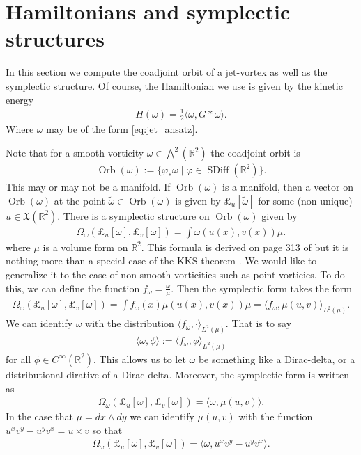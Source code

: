 \documentclass[12pt]{amsart}
\newcommand{\R}{\ensuremath{\mathbb{R}}}
\DeclareMathOperator{\SDiff}{SDiff}
\DeclareMathOperator{\Orb}{Orb}
\begin{document}
\section{Hamiltonians and symplectic structures}
\label{sec:symplectic}
In this section we compute the coadjoint orbit of a jet-vortex
as well as the symplectic structure.
Of course, the Hamiltonian we use is given by
the kinetic energy
\begin{align*}
  H(\omega) = \frac{1}{2} \langle \omega , G* \omega \rangle.
\end{align*}
Where $\omega$ may be of the form \eqref{eq:jet_ansatz}.

Note that for a smooth vorticity $\omega \in \bigwedge^2(\R^2)$
the coadjoint orbit is
\begin{align*}
  \Orb(\omega) := \{ \varphi_* \omega \mid \varphi \in \SDiff(\R^2) \}.
\end{align*}
This may or may not be a manifold.
If $\Orb(\omega)$ is a manifold, then a vector on $\Orb(\omega)$ at the point $\tilde{\omega} \in \Orb(\omega)$ is given by $\pounds_u[\tilde\omega]$ for some (non-unique) $u \in \mathfrak{X}(\R^2)$. There is a symplectic structure on $\Orb(\omega)$
given by
\begin{align*}
  \Omega_\omega( \pounds_u[\omega] , \pounds_v[\omega] ) = \int \omega( u(x), v(x) ) \mu.
\end{align*}
where $\mu$ is a volume form on $\R^2$.
This formula is derived on page 313 of \cite{MarsdenWeinstein1983}
but it is nothing more than a special case of the KKS theorem \cite[see the boxed formula on p.303]{FOM}.
We would like to generalize it to the case of non-smooth vorticities such
as point vorticies.  To do this, we can define the function $f_\omega = \frac{\omega}{\mu}$.  Then the symplectic form takes the form
\begin{align*}
  \Omega_\omega( \pounds_u[\omega] , \pounds_v[\omega] ) = \int f_{\omega}(x) \mu( u(x), v(x) ) \mu = \langle f_{\omega}, \mu(u,v) \rangle_{L^2(\mu)}.
\end{align*}
We can identify $\omega$ with the distribution $\langle f_\omega , \cdot \rangle_{L^2(\mu)}$.
That is to say
\begin{align*}
  \langle \omega , \phi \rangle := \langle f_\omega , \phi \rangle_{L^2(\mu)}
\end{align*}
for all $\phi \in C^\infty(\R^2)$.
This allows us to let $\omega$ be something like a Dirac-delta,
or a distributional dirative of a Dirac-delta.
Moreover, the symplectic form is written as
\begin{align*}
  \Omega_\omega( \pounds_u[\omega], \pounds_v[\omega]) = \langle \omega , \mu(u,v) \rangle.
\end{align*}
In the case that $\mu = dx \wedge dy$ we can 
identify $\mu(u,v)$ with the function $u^x v^y - u^y v^x = u \times v$ so that
\begin{align*}
  \Omega_\omega( \pounds_u[\omega], \pounds_v[\omega]) = \langle \omega , u^x v^y - u^y v^x \rangle.
\end{align*}
\end{document}
